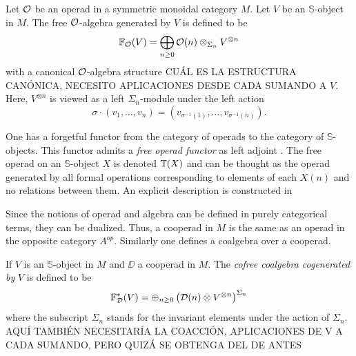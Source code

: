 \documentclass[TFM.tex]{subfiles}
\begin{document}
\begin{defi}
Let ${\mathcal O}$ be an operad in a symmetric monoidal category $M$. Let $V$ be an $\mathbb{S}$-object in $M$. The free ${\mathcal O}$-algebra generated by $V$ is defined to be
\[
\mathbb{F}_{\mathcal O}(V)=\bigoplus_{n\geq 0}{\mathcal O}(n)\otimes_{\Sigma_n}V^{\otimes n}
\]
with a canonical ${\mathcal O}$-algebra structure CUÁL ES LA ESTRUCTURA CANÓNICA, NECESITO APLICACIONES DESDE CADA SUMANDO A $V$. Here, $V^{\otimes n}$ is viewed as a left $\Sigma_n$-module under the left action 
\[
\sigma\cdot(v_1,\dots, v_n)=(v_{\sigma^{-1}(1)},\dots,v_{\sigma^{-1}(n)}).
\]


\end{defi} 

One has a forgetful functor from the category of operads to the category of $\mathbb{S}$-objects. This functor admits a \emph{free operad functor} as left adjoint \cite{GJHinich}. The free operad on an $\mathbb{S}$-object $X$ is denoted $\mathbb{T}(X)$ and can be thought as the operad generated by all formal operations corresponding to elements of each $X(n)$ and no relations between them. An explicit description is constructed in \cite{GJHinich}

Since the notions of operad and algebra can be defined in purely categorical terms, they can be dualized. Thus, a cooperad in $M$ is
the same as an operad in the opposite category $A^{op}$. Similarly one defines a coalgebra over a cooperad.


\begin{defi}
If $V$ is an $\mathbb{S}$-object in $M$ and $\DD$ a cooperad in $M$. The \emph{cofree coalgebra cogenerated by }$V$ is defined to be
\[
\mathbb{F}^*_{\mathcal{D}}(V)=\oplus_{n\geq 0}\left(\mathcal{D}(n)\otimes V^{\otimes n}\right)^{\Sigma_n}
\]
where the subscript $\Sigma_n$ stands for the invariant elements under the action of $\Sigma_n$. AQUÍ TAMBIÉN NECESITARÍA LA COACCIÓN, APLICACIONES DE V A CADA SUMANDO, PERO QUIZÁ SE OBTENGA DEL DE ANTES
%
%


\end{defi}
\end{document}
